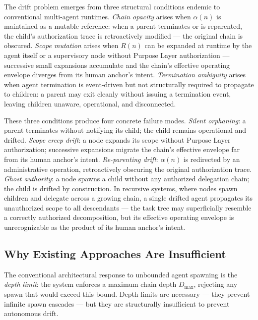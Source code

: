 The drift problem emerges from three structural conditions endemic to conventional multi-agent runtimes. \emph{Chain opacity} arises when $\alpha(n)$ is maintained as a mutable reference: when a parent terminates or is reparented, the child's authorization trace is retroactively modified — the original chain is obscured. \emph{Scope mutation} arises when $R(n)$ can be expanded at runtime by the agent itself or a supervisory node without Purpose Layer authorization — successive small expansions accumulate and the chain's effective operating envelope diverges from its human anchor's intent. \emph{Termination ambiguity} arises when agent termination is event-driven but not structurally required to propagate to children: a parent may exit cleanly without issuing a termination event, leaving children unaware, operational, and disconnected.

These three conditions produce four concrete failure modes. \emph{Silent orphaning}: a parent terminates without notifying its child; the child remains operational and drifted. \emph{Scope creep drift}: a node expands its scope without Purpose Layer authorization; successive expansions migrate the chain's effective envelope far from its human anchor's intent. \emph{Re-parenting drift}: $\alpha(n)$ is redirected by an administrative operation, retroactively obscuring the original authorization trace. \emph{Ghost authority}: a node spawns a child without any authorized delegation chain; the child is drifted by construction. In recursive systems, where nodes spawn children and delegate across a growing chain, a single drifted agent propagates its unauthorized scope to all descendants — the task tree may superficially resemble a correctly authorized decomposition, but its effective operating envelope is unrecognizable as the product of its human anchor's intent.

\subsection{Why Existing Approaches Are Insufficient}

The conventional architectural response to unbounded agent spawning is the \emph{depth limit}: the system enforces a maximum chain depth $D_{\max}$, rejecting any spawn that would exceed this bound. Depth limits are necessary — they prevent infinite spawn cascades — but they are structurally insufficient to prevent autonomous drift.

